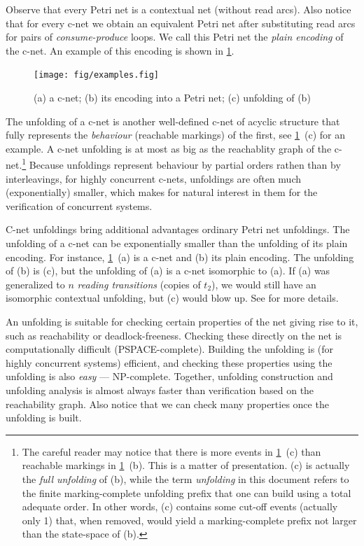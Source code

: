\documentclass[a4paper]{refart}
\begin{document}
Observe that every Petri net is a contextual net (without read arcs).
Also notice that for every c-net we obtain an equivalent Petri net after
substituting read arcs for pairs of \emph{consume-produce} loops.  We
call this Petri net the \emph{plain encoding} of the c-net.
An example of this encoding is shown in \cref{f:examples}.

\begin{figure}[h]
\hspace{-1ex}
\texttt{[image: fig/examples.fig]}
\caption{(a) a c-net; (b) its encoding into a Petri net; (c) unfolding of
(b)}
\label{f:examples}
\end{figure}

The unfolding of a c-net is another well-defined c-net of
acyclic structure that fully represents the \textit{behaviour} (reachable
markings) of the first,
see \cref{f:examples}~(c) for an example.
A c-net unfolding is at most as big as the reachablity graph of the
c-net.\footnote{The careful reader may notice that there is more events in
\cref{f:examples}~(c) than reachable markings in \cref{f:examples}~(b).
This is a matter of presentation.
(c) is actually the \emph{full unfolding}\cite{BBCKRS12}
of (b), while the term \emph{unfolding} in this document refers
to the finite marking-complete unfolding prefix that one can build
using a total adequate order\cite{BBCKRS12}.
In other words, (c) contains some cut-off events (actually only 1)
that, when removed, would
yield a marking-complete prefix not larger than the state-space of (b).}
Because unfoldings represent behaviour by partial orders rathen than by
interleavings,
for highly concurrent c-nets, unfoldings are often much
(exponentially) smaller, which makes for natural interest in them
for the verification of concurrent systems.

C-net unfoldings bring additional advantages \wrt ordinary Petri net
unfoldings.
The unfolding of a c-net can be exponentially smaller than the unfolding of
its plain encoding.
For instance, \cref{f:examples}~(a) is a c-net
and (b) its plain encoding.
The unfolding of (b) is (c), but the unfolding of (a) is a c-net isomorphic
to (a).
If (a) was generalized to $n$ \emph{reading transitions} (copies of $t_2$),
we would still have an isomorphic contextual unfolding, but (c) would blow
up.  See \cite{BBCKRS12} for more details.

An unfolding is suitable for checking certain properties of the net giving
rise to it, such as reachability or deadlock-freeness.
Checking these directly on the net is
computationally difficult (PSPACE-complete).
Building the unfolding is (for highly concurrent systems) efficient,
and checking these properties using the
unfolding is also \textit{easy} --- NP-complete.
Together, unfolding construction and unfolding analysis is 
almost always faster than verification based on the reachability graph.
Also notice that we can check many properties once the unfolding is built.
\end{document}
